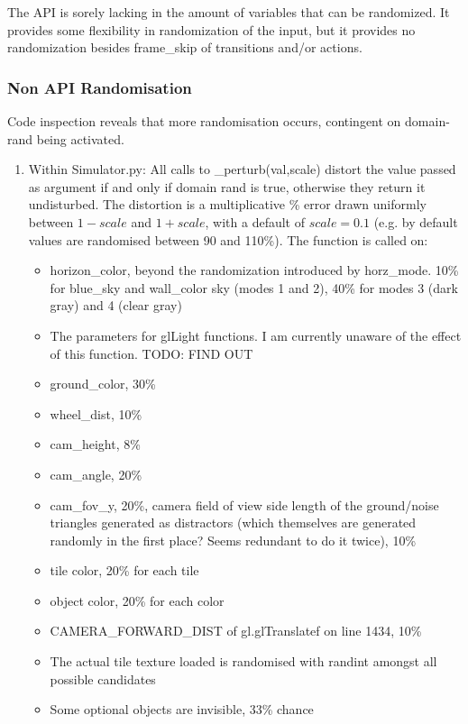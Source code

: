 \documentclass[12pt]{article}
\begin{document}
The API is sorely lacking in the amount of variables that can be randomized. It provides some flexibility in randomization of the input, but it provides no randomization besides frame\_skip of transitions and/or actions.
\subsubsection{Non API Randomisation}
Code inspection reveals that more randomisation occurs, contingent on domain-rand being activated. 
\begin{enumerate}
    \item Within Simulator.py: All calls to \_perturb(val,scale) distort the value passed as argument if and only if domain rand is true, otherwise they return it undisturbed. The distortion is a multiplicative \% error drawn uniformly between $1 - scale$ and $1 + scale$, with a default of $scale = 0.1$ (e.g. by default values are randomised between 90 and 110\%). The function is called on:
    \begin{itemize}
        \item horizon\_color, beyond the randomization introduced by horz\_mode. 10\% for blue\_sky and wall\_color sky (modes 1 and 2), 40\% for modes 3 (dark gray) and 4 (clear gray)
        \item The parameters for glLight functions. I am currently unaware of the effect of this function. TODO: FIND OUT
        \item ground\_color, 30\%
        \item wheel\_dist, 10\%
        \item cam\_height, 8\%
        \item cam\_angle, 20\%
        \item cam\_fov\_y, 20\%, camera field of view
        side length of the ground/noise triangles generated as distractors (which themselves are generated randomly in the first place? Seems redundant to do it twice), 10\%
        \item tile color, 20\% for each tile
        \item object color, 20\% for each color
        \item CAMERA\_FORWARD\_DIST of gl.glTranslatef on line 1434, 10\%
        \item The actual tile texture loaded is randomised with randint amongst all possible candidates
        \item Some optional objects are invisible, 33\% chance
    \end{itemize}

\end{enumerate}
\end{document}
